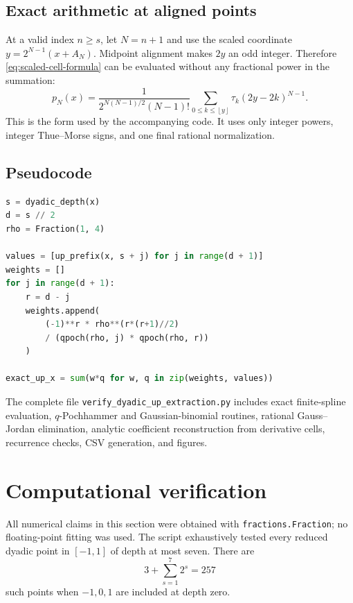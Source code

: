 \documentclass[11pt,oneside]{article}
\numberwithin{equation}{section}
\theoremstyle{definition}
\theoremstyle{remark}
\newcommand{\floor}[1]{\left\lfloor #1\right\rfloor}
\newcommand{\TM}{\tau}
\begin{document}
\subsection{Exact arithmetic at aligned points}

At a valid index $n\ge s$, let $N=n+1$ and use the scaled coordinate
$y=2^{N-1}(x+A_N)$.  Midpoint alignment makes $2y$ an odd integer.  Therefore
\eqref{eq:scaled-cell-formula} can be evaluated without any fractional power in
the summation:
\begin{equation}
 p_N(x)=\frac{1}{2^{N(N-1)/2}(N-1)!}
 \sum_{0\le k\le\floor y}\TM_k(2y-2k)^{N-1}.
 \label{eq:integer-midpoint-evaluation}
\end{equation}
This is the form used by the accompanying code.  It uses only integer powers,
integer Thue--Morse signs, and one final rational normalization.

\subsection{Pseudocode}

\begin{lstlisting}[style=code,language=Python,caption={Core exact extraction logic.}]
s = dyadic_depth(x)
d = s // 2
rho = Fraction(1, 4)

values = [up_prefix(x, s + j) for j in range(d + 1)]
weights = []
for j in range(d + 1):
    r = d - j
    weights.append(
        (-1)**r * rho**(r*(r+1)//2)
        / (qpoch(rho, j) * qpoch(rho, r))
    )

exact_up_x = sum(w*q for w, q in zip(weights, values))
\end{lstlisting}

The complete file \texttt{verify\_dyadic\_up\_extraction.py} includes exact
finite-spline evaluation, $q$-Pochhammer and Gaussian-binomial routines,
rational Gauss--Jordan elimination, analytic coefficient reconstruction from
derivative cells, recurrence checks, CSV generation, and figures.

\section{Computational verification}

All numerical claims in this section were obtained with
\texttt{fractions.Fraction}; no floating-point fitting was used.  The script
exhaustively tested every reduced dyadic point in $[-1,1]$ of depth at most seven.
There are
\begin{equation}
 3+\sum_{s=1}^{7}2^s=257
 \label{eq:point-count}
\end{equation}
such points when $-1,0,1$ are included at depth zero.
\end{document}
